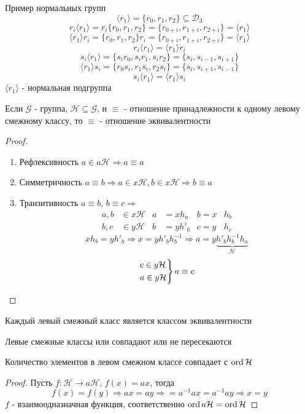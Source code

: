\documentclass[../main/document.tex]{subfiles}
\begin{document}
\begin{exm}
Пример нормальных групп
$$\langle r_1\rangle=\{r_0,r_1,r_2\}\subseteq \mathcal{D}_3$$
$$r_i\langle r_1\rangle=r_i\{r_0,r_1,r_2\}=\{r_{0+i},r_{1+i},r_{2+i}\}=\langle r_1\rangle$$
$$\langle r_1\rangle r_i=\{r_0,r_1,r_2\}r_i=\{r_{0+i},r_{1+i},r_{2+i}\}=\langle r_1\rangle$$
$$r_i\langle r_1\rangle=\langle r_1\rangle r_i$$
$$s_i\langle r_1\rangle=\{s_ir_0,s_ir_1,s_ir_2\}=\{s_i,s_{i-1},s_{i+1}\}$$
$$\langle r_1\rangle s_i=\{r_0s_i,r_1s_i,r_2s_i\}=\{s_i,s_{i+1},s_{i-1}\}$$
$$s_i\langle r_1\rangle=\langle r_1\rangle s_i$$
$\langle r_1\rangle$ - нормальная подгруппа

\end{exm}

\begin{thm}
Если $\mathcal{G}$ - группа, $\mathcal{H}\subseteq \mathcal{G}$, и $\equiv$ - отношение принадлежности к одному левому смежному классу, то $\equiv$ - отношение эквивалентности
\begin{proof}
\begin{enumerate}
\item Рефлексивность $a\in a\mathcal{H}\Rightarrow a\equiv a$
\item Симметричность $a\equiv b\Rightarrow a \in x\mathcal{H}, b\in x\mathcal{H}\Rightarrow b\equiv a$
\item Транзитивность $a\equiv b$, $b\equiv c\Rightarrow $
\begin{align*}
a,b&\in x\mathcal{H} & a &=xh_a & b=x&h_b \\
b,c&\in y\mathcal{H} & b &=yh'_b & c=y&h_c 
\end{align*} 
$$xh_b=yh'_b\Rightarrow x=yh'_bh^{-1}_b\Rightarrow a=y\underbrace{h'_bh^{-1}_bh_a}_{\mathcal{H}}$$
$$
\begin{rcases}
c \in y\mathcal{H}\\
a\in y\mathcal{H}
\end{rcases}
a\equiv c
$$
\end{enumerate}
\end{proof}
\end{thm}

\begin{cnsq}
Каждый левый смежный класс является классом эквивалентности
\end{cnsq}

\begin{cnsq}
Левые смежные классы или совпадают или не пересекаются
\end{cnsq}

\begin{cnsq}
Количество элементов в левом смежном классе совпадает с $\operatorname{ord} \mathcal{H}$
\begin{proof}
Пусть $f:\mathcal{H}\rightarrow a\mathcal{H}$, $f(x)=ax$, тогда
$$f(x)=f(y)\Rightarrow ax=ay\Rightarrow=a^{-1}ax=a^{-1}ay\Rightarrow x=y$$
$f$ - взаимоодназначная функция, соответственно $\operatorname{ord} a\mathcal{H}=\operatorname{ord} \mathcal{H}$
\end{proof}
\end{cnsq}
\end{document}
